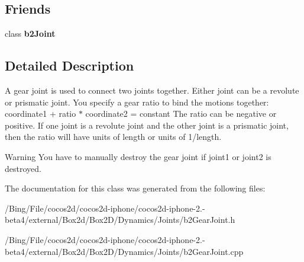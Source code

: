 \subsection*{Friends}
\begin{DoxyCompactItemize}
\item 
\hypertarget{classb2_gear_joint_a54ade8ed3d794298108d7f4c4e4793fa}{class {\bfseries b2\-Joint}}\label{classb2_gear_joint_a54ade8ed3d794298108d7f4c4e4793fa}

\end{DoxyCompactItemize}


\subsection{Detailed Description}
A gear joint is used to connect two joints together. Either joint can be a revolute or prismatic joint. You specify a gear ratio to bind the motions together\-: coordinate1 + ratio $\ast$ coordinate2 = constant The ratio can be negative or positive. If one joint is a revolute joint and the other joint is a prismatic joint, then the ratio will have units of length or units of 1/length. \begin{DoxyWarning}{Warning}
You have to manually destroy the gear joint if joint1 or joint2 is destroyed. 
\end{DoxyWarning}


The documentation for this class was generated from the following files\-:\begin{DoxyCompactItemize}
\item 
/\-Bing/\-File/cocos2d/cocos2d-\/iphone/cocos2d-\/iphone-\/2.-\/beta4/external/\-Box2d/\-Box2\-D/\-Dynamics/\-Joints/b2\-Gear\-Joint.\-h\item 
/\-Bing/\-File/cocos2d/cocos2d-\/iphone/cocos2d-\/iphone-\/2.-\/beta4/external/\-Box2d/\-Box2\-D/\-Dynamics/\-Joints/b2\-Gear\-Joint.\-cpp\end{DoxyCompactItemize}
